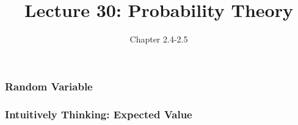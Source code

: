 \documentclass[handout]{beamer}
\title{Lecture 30: Probability Theory}
\author{Chapter 2.4-2.5}
\date{}
\newcommand{\blue}[1]{\textcolor{blue2}{#1}}
\begin{document}
\begin{frame}
\titlepage
\end{frame}


\begin{frame}[fragile]
\frametitle{Random Variable}


\end{frame}


\begin{frame}
\frametitle{Intuitively Thinking: Expected Value}
 
%
%
%
%

\end{frame}
\end{document}
